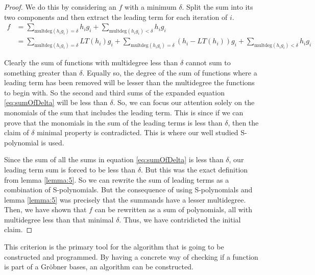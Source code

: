 \begin{proof}
    We do this by considering an $f$ with a minimum $\delta$. Split the sum into its two components and then extract the leading term for each iteration of $i$.
\begin{equation}\label{eq:sumOfDelta} 
    \begin{aligned}
    f
    &= \sum_{\text{multdeg}(h_i g_i)=\delta} h_i g_i
    + \sum_{\text{multdeg}(h_i g_i)<\delta} h_i g_i \\
    &= \sum_{\text{multdeg}(h_i g_i)=\delta} LT(h_i) g_i 
    + \sum_{\text{multdeg}(h_i g_i) = \delta} (h_i-LT(h_i)) g_i
    + \sum_{\text{multdeg}(h_i g_i)<\delta} h_i g_i
    \end{aligned}
\end{equation}

Clearly the sum of functions with multidegree less than $\delta$ cannot sum to something greater than $\delta$. Equally so, the degree of the sum of functions where a leading term has been removed will be lesser than the multidegree the functions to begin with. So the second and third sums of the expanded equation \ref{eq:sumOfDelta} will be less than $\delta$. So, we can focus our attention solely on the monomials of the sum that includes the leading term. This is since if we can prove that the monomials in the sum of the leading terms is less than $\delta$, then the claim of $\delta$ minimal property is contradicted. This is where our well studied S-polynomial is used. 

Since the sum of all the sums in equation \ref{eq:sumOfDelta} is less than $\delta$, our leading term sum is forced to be less than $\delta$. But this was the exact definition from lemma \ref{lemma:5}. So we can rewrite the sum of leading terms as a combination of S-polynomials. But the consequence of using S-polynomials and lemma \ref{lemma:5} was precisely that the summands have a lesser multidegree. Then, we have shown that $f$ can be rewritten as a sum of polynomials, all with multidegree less than that minimal $\delta$. Thus, we have contridicted the initial claim.

\end{proof}

This criterion is the primary tool for the algorithm that is going to be constructed and programmed. By having a concrete way of checking if a function is part of a Gröbner bases, an algorithm can be constructed. 
